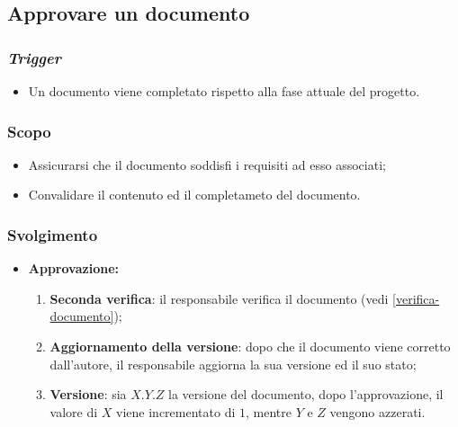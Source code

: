 \subsection{Approvare un documento}
\label{approvazione-documento}

\subsubsection{\textit{Trigger}}
\begin{itemize}
	\item Un documento viene completato rispetto alla fase attuale del progetto.
\end{itemize}

\subsubsection{Scopo}
\begin{itemize}
	\item Assicurarsi che il documento soddisfi i requisiti ad esso associati;

	\item Convalidare il contenuto ed il completameto del documento.
\end{itemize}

\subsubsection{Svolgimento}
\begin{itemize}
	\item \textbf{Approvazione:}
	      \begin{enumerate}
		      \item \textbf{Seconda verifica}: il responsabile verifica il
		            documento (vedi \cref{verifica-documento});

		      \item \textbf{Aggiornamento della versione}: dopo che il documento
		            viene corretto dall'autore, il responsabile aggiorna la
		            sua versione ed il suo stato;

		      \item \textbf{Versione}: sia $X.Y.Z$ la versione del documento,
		            dopo l'approvazione, il valore di $X$ viene incrementato di
		            $1$, mentre $Y$ e $Z$ vengono azzerati.
	      \end{enumerate}
\end{itemize}
